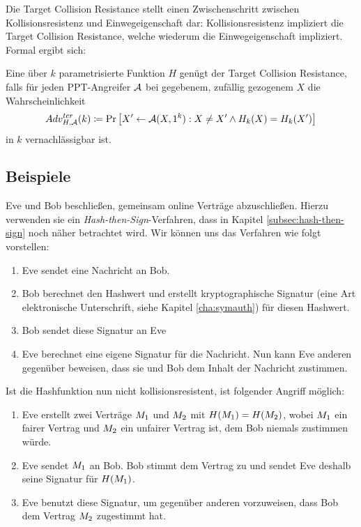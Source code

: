 Die Target Collision Resistance stellt einen Zwischenschritt zwischen
Kollisionsresistenz und Einwegeigenschaft dar: Kollisionsresistenz
impliziert die Target Collision Resistance, welche wiederum die
Einwegeigenschaft impliziert. Formal ergibt sich:

\begin{definition}
Eine über $k$ parametrisierte Funktion $H$ genügt der Target Collision
Resistance\indexTargetCollisionResistance, falls für jeden PPT-Angreifer
$\mathcal{A}$ bei gegebenem, zufällig gezogenem $X$ die Wahrscheinlichkeit
\begin{equation*}
Adv^{tcr}_{H,\mathcal{A}}(k)\coloneqq \Pr \left[ X' \leftarrow \mathcal{A}(X, 1^k) : X \neq X'
  \land H_k(X) = H_k(X')\right] 
\end{equation*}
in $k$ vernachlässigbar ist.
\end{definition}
\subsection{Beispiele}

\begin{beispiel}\indexCollisionResistance
Eve und Bob beschließen, gemeinsam online Verträge abzuschließen. Hierzu
verwenden sie ein \textit{Hash-then-Sign}-Verfahren, dass in Kapitel
\ref{subsec:hash-then-sign} noch näher betrachtet wird. Wir können uns
das Verfahren wie 
folgt vorstellen: 
\begin{enumerate}
\item Eve sendet eine Nachricht an Bob.
\item Bob berechnet den Hashwert und erstellt kryptographische
  Signatur (eine Art \glqq elektronische Unterschrift\grqq, siehe
  Kapitel \ref{cha:symauth}) für diesen Hashwert.
\item Bob sendet diese Signatur an Eve
\item Eve berechnet eine eigene Signatur für die Nachricht. Nun kann Eve
  anderen gegenüber beweisen, dass sie und Bob dem Inhalt der Nachricht
  zustimmen. 
\end{enumerate}
Ist die Hashfunktion nun nicht kollisionsresistent, ist folgender
Angriff möglich:
\begin{enumerate}
\item Eve erstellt zwei Verträge $M_1$ und $M_2$ mit
  $H(M_1) = H(M_2)$, wobei
  $M_1$ ein fairer Vertrag und $M_2$ ein unfairer Vertrag
  ist, dem Bob niemals zustimmen würde.
\item Eve sendet $M_1$ an Bob. Bob stimmt dem Vertrag zu und
  sendet Eve deshalb seine Signatur für $H(M_1)$.
\item Eve benutzt diese Signatur, um gegenüber anderen vorzuweisen, dass
  Bob dem Vertrag $M_2$ zugestimmt hat.
\end{enumerate}
\end{beispiel}

